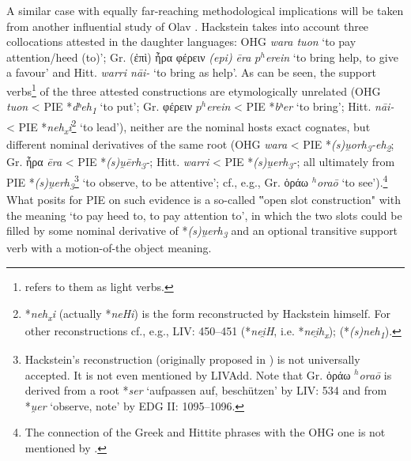 \documentclass[output=paper,colorlinks,citecolor=brown]{langscibook}
\begin{document}
A similar case with equally far-reaching methodological implications will be taken from another influential study of Olav \citet[96--101]{Hackstein2012}. Hackstein takes into account three collocations attested in the daughter languages: OHG \textit{wara tuon} ‘to pay attention/heed (to)’; Gr. (ἐπὶ) ἦρα φέρειν \textit{(epi) ēra $p^h$erein} ‘to bring help, to give a favour’ and Hitt. \textit{warri nāi-} ‘to bring as help’. As can be seen, the support verbs\footnote{\citet[96]{Hackstein2012} refers to them as light verbs.}
of the three attested constructions are etymologically unrelated (OHG \textit{tuon} < PIE *\textit{dʰeh\textsubscript{1}} ‘to put’; Gr. φέρειν \textit{$p^h$erein} < PIE *\textit{bʰer} ‘to bring’; Hitt. \textit{nāi-} < PIE *\textit{neh\textsubscript{x}i}\footnote{*\textit{neh\textsubscript{x}i} (actually *\textit{neHi}) is the form reconstructed by Hackstein himself. For other reconstructions cf., e.g., LIV: 450--451 (*\textit{nei̯H}, i.e. *\textit{nei̯h\textsubscript{x}}); \citealt{KloekhorstLubotsky2014} (*\textit{(s)neh\textsubscript{1}}).}
‘to lead’), neither are the nominal hosts exact cognates, but different nominal derivatives of the same root (OHG \textit{wara} < PIE *\textit{(s)u̯orh\textsubscript{3}-eh\textsubscript{2}}; Gr. ἦρα \textit{ēra} < PIE  *\textit{(s)u̯ērh\textsubscript{3}-}; Hitt. \textit{warri} < PIE *\textit{(s)u̯erh\textsubscript{3}-}; all ultimately from PIE *\textit{(s)u̯erh\textsubscript{3}}\footnote{Hackstein’s reconstruction (originally proposed in \citealt[123--131]{Hackstein2002a}) is not universally accepted. It is not even mentioned by LIVAdd. Note that Gr. ὁράω \textit{$^h$oraō} is derived from a root *\textit{ser} ‘aufpassen auf, beschützen’ by LIV: 534 and from *\textit{u̯er} ‘observe, note’ by EDG II: 1095--1096.}
‘to observe, to be attentive’; cf., e.g., Gr. ὁράω \textit{$^h$oraō} ‘to see’).\footnote{The connection of the Greek and Hittite phrases with the OHG one is not mentioned by \citet{GarcíaRamón2006}.}
What \citet[96]{Hackstein2012} posits for PIE on such evidence is a so-called ‟open slot construction" with the meaning ‘to pay heed to, to pay attention to’, in which the two slots could be filled by some nominal derivative of *\textit{(s)u̯erh\textsubscript{3}} and an optional transitive support verb with a motion-of-the object meaning.
\end{document}
